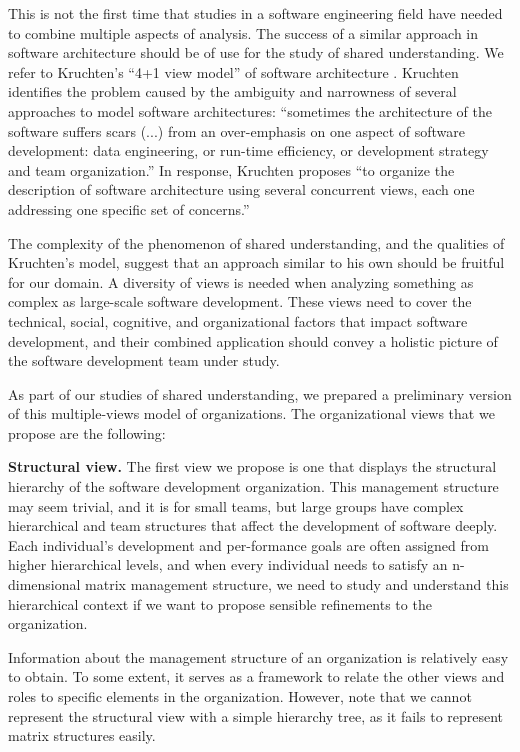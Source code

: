 This is not the first time that studies in a software engineering field have needed to combine multiple aspects of analysis. The success of a similar approach in software architecture should be of use for the study of shared understanding. We refer to Kruchten's ``4+1 view model'' of software architecture \cite{Kruchten1995}. Kruchten identifies the problem caused by the ambiguity and narrowness of several approaches to model software architectures: ``sometimes the architecture of the software suffers scars (...) from an over-emphasis on one aspect of software development: data engineering, or run-time efficiency, or development strategy and team organization.'' In response, Kruchten proposes ``to organize the description of software architecture using several concurrent views, each one addressing one specific set of concerns.''

The complexity of the phenomenon of shared understanding, and the qualities of Kruchten's model, suggest that an approach similar to his own should be fruitful for our domain. A diversity of views is needed when analyzing something as complex as large-scale software development. These views need to cover the technical, social, cognitive, and organizational factors that impact software development, and their combined application should convey a holistic picture of the software development team under study.

As part of our studies of shared understanding, we prepared a preliminary version of this multiple-views model of organizations. The organizational views that we propose are the following:

\textbf{Structural view.} The first view we propose is one that displays the structural hierarchy of the software development organization. This management structure may seem trivial, and it is for small teams, but large groups have complex hierarchical and team structures that affect the development of software deeply. Each individual's development and per-formance goals are often assigned from higher hierarchical levels, and when every individual needs to satisfy an n-dimensional matrix management structure, we need to study and understand this hierarchical context if we want to propose sensible refinements to the organization.

Information about the management structure of an organization is relatively easy to obtain. To some extent, it serves as a framework to relate the other views and roles to specific elements in the organization. However, note that we cannot represent the structural view with a simple hierarchy tree, as it fails to represent matrix structures easily.

